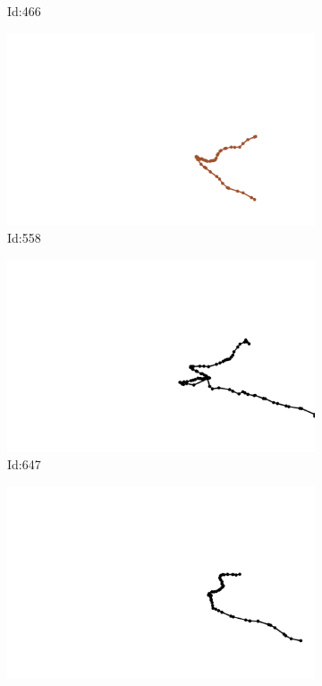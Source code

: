 \documentclass[12pt,twoside]{report}
\begin{document}
\begin{figure}
\begin{subfigure}[b]{0.20\textwidth}
\caption{Id:466}
\end{subfigure}
\begin{subfigure}[b]{0.20\textwidth}
\centering
\includegraphics[width=\textwidth]{../../trajectories/558.png}
\caption{Id:558}
\end{subfigure}
\begin{subfigure}[b]{0.20\textwidth}
\centering
\includegraphics[width=\textwidth]{../../trajectories/647.png}
\caption{Id:647}
\end{subfigure}
\begin{subfigure}[b]{0.20\textwidth}
\centering
\includegraphics[width=\textwidth]{../../trajectories/773.png}

\end{subfigure}
\end{figure}
\end{document}
